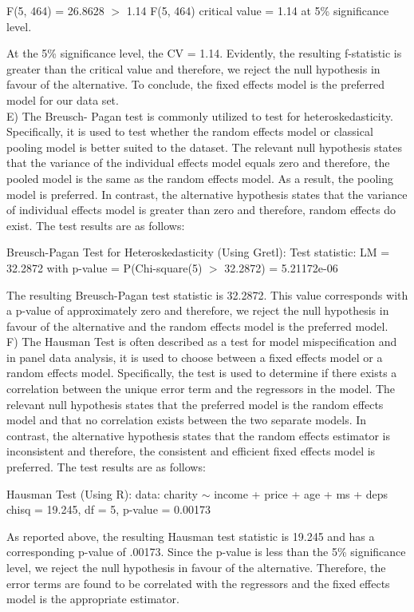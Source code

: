 \documentclass[12pt]{article}
\begin{document}
\begin{flushleft}
F(5, 464) = 26.8628 $>$ 1.14
\break
F(5, 464) critical value = 1.14 at 5\% significance level.
\end{flushleft} 

At the 5\% significance level, the CV = 1.14. Evidently, the resulting f-statistic is greater than the critical value and therefore, we reject the null hypothesis in favour of the alternative. To conclude, the fixed effects model is the preferred model for our data set.\\

E)  The Breusch- Pagan test is commonly utilized to test for heteroskedasticity. Specifically, it is used to test whether the random effects model or classical pooling model is better suited to the dataset. The relevant null hypothesis states that the variance of the individual effects model equals zero and therefore, the pooled model is the same as the random effects model. As a result, the pooling model is preferred. In contrast, the alternative hypothesis states that the variance of individual effects model is greater than zero and therefore, random effects do exist. The test results are as follows:

\begin{flushleft}
Breusch-Pagan Test for Heteroskedasticity (Using Gretl):
\break
Test statistic: LM = 32.2872
\break
with p-value = P(Chi-square(5) $>$ 32.2872) = 5.21172e-06
\end{flushleft}

The resulting Breusch-Pagan test statistic is 32.2872. This value corresponds with a p-value of approximately zero and therefore, we reject the null hypothesis in favour of the alternative and the random effects model is the preferred model. \\

F) The Hausman Test is often described as a test for model mispecification and in panel data analysis, it is used to choose between a fixed effects model or a random effects model. Specifically, the test is used to determine if there exists a correlation between the unique error term and the regressors in the model. The relevant null hypothesis states that the preferred model is the random effects model and that no correlation exists between the two separate models. In contrast, the alternative hypothesis states that the random effects estimator is inconsistent and therefore, the consistent and efficient fixed effects model is preferred. The test results are as follows: 
\begin{flushleft}
Hausman Test (Using R):
\break
data:  charity $\sim$ income + price + age + ms + deps
\break
chisq = 19.245, df = 5, p-value = 0.00173
\end{flushleft}
As reported above, the resulting Hausman test statistic is 19.245 and has a corresponding p-value of .00173. Since the p-value is less than the 5\% significance level, we reject the null hypothesis in favour of the alternative. Therefore, the error terms are found to be correlated with the regressors and the fixed effects model is the appropriate estimator. \\
\end{document}
